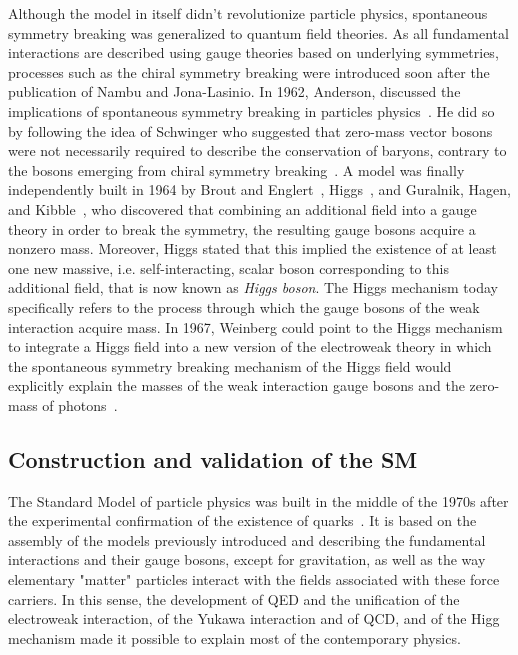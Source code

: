 	Although the model in itself didn't revolutionize particle physics, spontaneous symmetry breaking was generalized to quantum field theories. As all fundamental interactions are described using gauge theories based on underlying symmetries, processes such as the chiral symmetry breaking were introduced soon after the publication of Nambu and Jona-Lasinio. In 1962, Anderson, discussed the implications of spontaneous symmetry breaking in particles physics~\cite{ANDERSON1963}. He did so by following the idea of Schwinger who suggested that zero-mass vector bosons were not necessarily required to describe the conservation of baryons, contrary to the bosons emerging from chiral symmetry breaking~\cite{SCHWINGER1962}. A model was finally independently built in 1964 by Brout and Englert~\cite{ENGLERT1964}, Higgs~\cite{HIGGS1964}, and Guralnik, Hagen, and Kibble~\cite{GURALNIK1964}, who discovered that combining an additional field into a gauge theory in order to break the symmetry, the resulting gauge bosons acquire a nonzero mass. Moreover, Higgs stated that this implied the existence of at least one new massive, i.e. self-interacting, scalar boson corresponding to this additional field, that is now known as \textit{Higgs boson}. The Higgs mechanism today specifically refers to the process through which the gauge bosons of the weak interaction acquire mass. In 1967, Weinberg could point to the Higgs mechanism to integrate a Higgs field into a new version of the electroweak theory in which the spontaneous symmetry breaking mechanism of the Higgs field would explicitly explain the masses of the weak interaction gauge bosons and the zero-mass of photons~\cite{WEINBERG1967}.
	
	\subsection{Construction and validation of the \acl{SM}}
	\label{chapt2:ssec:model}
	
	The Standard Model of particle physics was built in the middle of the 1970s after the experimental confirmation of the existence of quarks~\cite{SMWIKI}. It is based on the assembly of the models previously introduced and describing the fundamental interactions and their gauge bosons, except for gravitation, as well as the way elementary "matter" particles interact with the fields associated with these force carriers. In this sense, the development of QED and the unification of the electroweak interaction, of the Yukawa interaction and of QCD, and of the Higg mechanism made it possible to explain most of the contemporary physics.
	
